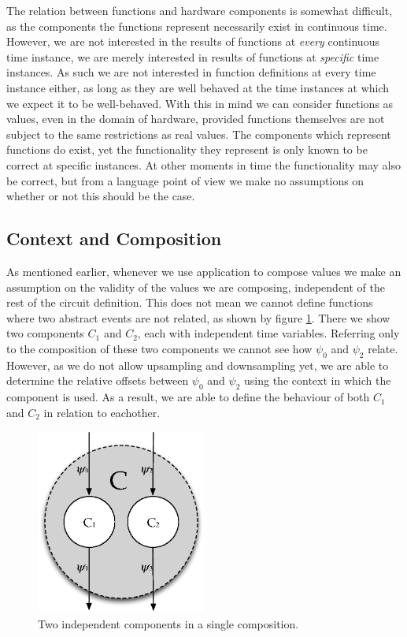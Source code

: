 The relation between functions and hardware components is somewhat difficult, as the components the functions represent necessarily exist in continuous time.
However, we are not interested in the results of functions at \textit{every} continuous time instance, we are merely interested in results of functions at \textit{specific} time instances.
As such we are not interested in function definitions at every time instance either, as long as they are well behaved at the time instances at which we expect it to be well-behaved.
With this in mind we can consider functions as values, even in the domain of hardware, provided functions themselves are not subject to the same restrictions as real values.
The components which represent functions do exist, yet the functionality they represent is only known to be correct at specific instances. 
At other moments in time the functionality may also be correct, but from a language point of view we make no assumptions on whether or not this should be the case.

\subsection{Context and Composition}
As mentioned earlier, whenever we use application to compose values we make an assumption on the validity of the values we are composing, independent of the rest of the circuit definition.
This does not mean we cannot define functions where two abstract events are not related, as shown by figure \ref{fig:indepcomp}.
There we show two components $C_1$ and $C_2$, each with independent time variables.
Referring only to the composition of these two components we cannot see how $\psi_0$ and $\psi_2$ relate.
However, as we do not allow upsampling and downsampling yet, we are able to determine the relative offsets between $\psi_0$ and $\psi_2$ using the context in which the component is used.
As a result, we are able to define the behaviour of both $C_1$ and $C_2$ in relation to eachother.


\begin{figure}[h]
\centering
\includegraphics[width=0.5\textwidth]{images/indepcomp}
\caption{Two independent components in a single composition.} \label{fig:indepcomp}
\end{figure}

